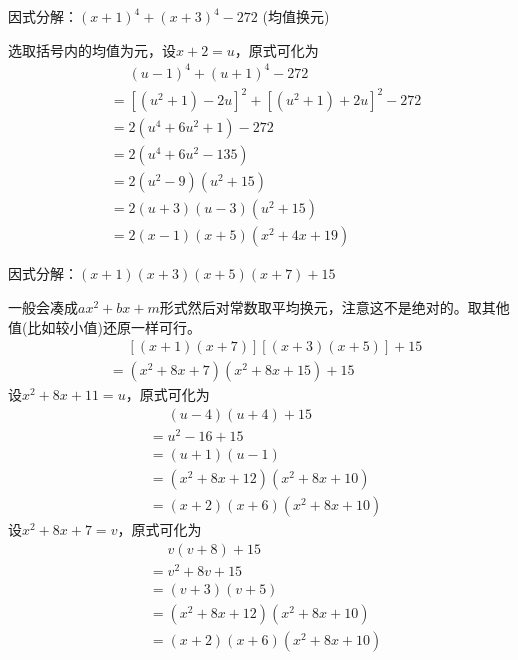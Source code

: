 \documentclass[windows,csize4]{BHCexam}
\begin{document}
\begin{groups}
\begin{questions}[]
        \question[5] 因式分解：$(x+1)^4+(x+3)^4-272$ (均值换元)
        \begin{solution}{0.5cm}
            \methodonly 选取括号内的均值为元，设$x+2=u$，原式可化为
            \[
                \begin{aligned}
                     & \phantom{=}(u-1)^4+(u+1)^4-272        \\
                     & = [(u^2+1)-2u]^2 + [(u^2+1)+2u]^2-272 \\
                     & = 2(u^4+6u^2+1)-272                   \\
                     & = 2(u^4+6u^2-135)                     \\
                     & = 2(u^2-9)(u^2+15)                    \\
                     & = 2(u+3)(u-3)(u^2+15)                 \\
                     & = 2(x-1)(x+5)(x^2+4x+19)
                \end{aligned}
            \]
        \end{solution}
        \vspace{3.5cm}

        \question[5] 因式分解：$(x+1)(x+3)(x+5)(x+7)+15$
        \begin{solution}{0.5cm}
            \method 一般会凑成$ax^2+bx+m$形式然后对常数取平均换元，注意这不是绝对的。取其他值(比如较小值)还原一样可行。
            \[
                \begin{aligned}
                     & \phantom{=}[(x+1)(x+7)][(x+3)(x+5)]+15 \\
                     & = (x^2+8x+7)(x^2+8x+15) +15
                \end{aligned}
            \]
            设$x^2+8x+11=u$，原式可化为
            \[
                \begin{aligned}
                     & \phantom{=}(u-4)(u+4)+15 \\
                     & =  u^2-16+15             \\
                     & = (u+1)(u-1)             \\
                     & = (x^2+8x+12)(x^2+8x+10) \\
                     & = (x+2)(x+6)(x^2+8x+10)
                \end{aligned}
            \]
            \method 设$x^2+8x+7=v$，原式可化为
            \[
                \begin{aligned}
                     & \phantom{=}v(v+8)+15     \\
                     & =  v^2+8v+15             \\
                     & = (v+3)(v+5)             \\
                     & = (x^2+8x+12)(x^2+8x+10) \\
                     & = (x+2)(x+6)(x^2+8x+10)
                \end{aligned}
            \]
        \end{solution}
        \vspace{3.5cm}


\end{questions}
\end{groups}
\end{document}
